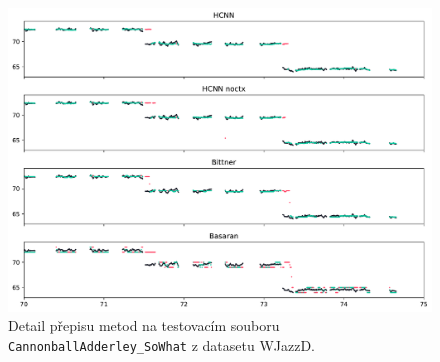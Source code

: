 




\begin{figure}[h]\centering
\includegraphics[width=\textwidth,height=\textheight,keepaspectratio]{../img/vysledky/wjazzd_CannonballAdderley_SoWh}
\caption{Detail přepisu metod na testovacím souboru \texttt{CannonballAdderley\_SoWhat} z datasetu WJazzD.}
\label{obr:wjazzd_CannonballAdderley_SoWhat_detail}
\end{figure}


